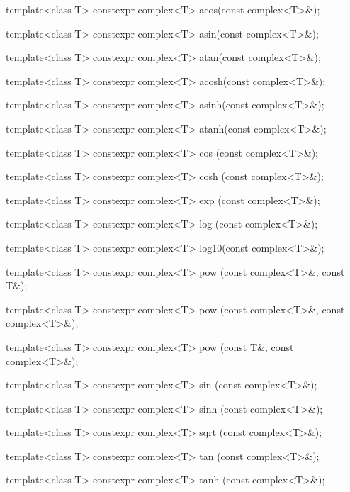 \documentclass[prd,twocolumn,amsmath,amssymb,nofootinbib,eqsecnum]{revtex4-1}
\newcommand{\code}[1]{{\tt #1}}
\newcommand{\highlight}[1]{{\color{green} #1}}
\begin{document}
\code{

\vspace{2ex}
  template<class T> \highlight{constexpr} complex<T> acos(const complex<T>\&);

  template<class T> \highlight{constexpr} complex<T> asin(const complex<T>\&);

  template<class T> \highlight{constexpr} complex<T> atan(const complex<T>\&);

\vspace{2ex}

  template<class T> \highlight{constexpr} complex<T> acosh(const complex<T>\&);

  template<class T> \highlight{constexpr} complex<T> asinh(const complex<T>\&);

  template<class T> \highlight{constexpr} complex<T> atanh(const complex<T>\&);

\vspace{2ex}

  template<class T> \highlight{constexpr} complex<T> cos  (const complex<T>\&);

  template<class T> \highlight{constexpr} complex<T> cosh (const complex<T>\&);

  template<class T> \highlight{constexpr} complex<T> exp  (const complex<T>\&);

  template<class T> \highlight{constexpr} complex<T> log  (const complex<T>\&);

  template<class T> \highlight{constexpr} complex<T> log10(const complex<T>\&);

\vspace{2ex}

  template<class T> \highlight{constexpr} complex<T> pow  (const complex<T>\&, const T\&);

  template<class T> \highlight{constexpr} complex<T> pow  (const complex<T>\&, const complex<T>\&);

  template<class T> \highlight{constexpr} complex<T> pow  (const T\&, const complex<T>\&);

\vspace{2ex}

  template<class T> \highlight{constexpr} complex<T> sin  (const complex<T>\&);

  template<class T> \highlight{constexpr} complex<T> sinh (const complex<T>\&);

  template<class T> \highlight{constexpr} complex<T> sqrt (const complex<T>\&);

  template<class T> \highlight{constexpr} complex<T> tan  (const complex<T>\&);

  template<class T> \highlight{constexpr} complex<T> tanh (const complex<T>\&);
}
\end{document}
